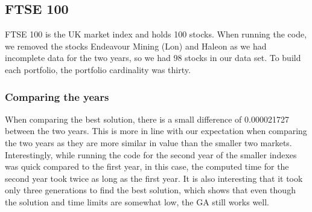 \documentclass[12pt]{report}
\begin{document}
\subsection{FTSE 100}
FTSE 100 is the UK market index and holds 100 stocks. When running the code, we removed the stocks Endeavour Mining (Lon) and Haleon as we had incomplete data for the two years, so we had 98 stocks in our data set. To build each portfolio, the portfolio cardinality was thirty.
\subsubsection*{Comparing the years}
\begin{table}[h!]
\centering
{}
\caption{FTSE: Year 1 vs Year 2}
\label{table:ftseyears}
\end{table}
\noindent
When comparing the best solution, there is a small difference of 0.000021727 between the two years. This is more in line with our expectation when comparing the two years as they are more similar in value than the smaller two markets. Interestingly, while running the code for the second year of the smaller indexes was quick compared to the first year, in this case, the computed time for the second year took twice as long as the first year. It is also interesting that it took only three generations to find the best solution, which shows that even though the solution and time limits are somewhat low, the GA still works well.
\end{document}

